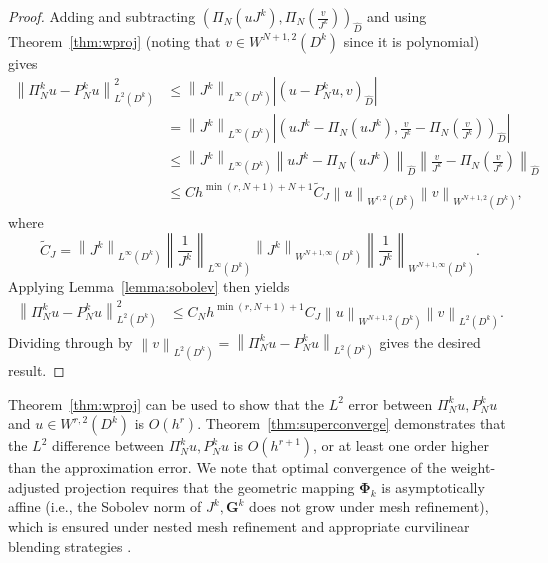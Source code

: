 \documentclass[preprint,10pt]{article}
\theoremstyle{definition}
\theoremstyle{lemma}
\theoremstyle{theorem}
\theoremstyle{assumption}
\renewcommand{\hat}{\widehat}
\renewcommand{\tilde}{\widetilde}
\newcommand{\nor}[1]{\left\| #1 \right\|}
\newcommand{\LRp}[1]{\left( #1 \right)}
\newcommand{\LRb}[1]{\left| #1 \right|}
\begin{document}
{\begin{proof}
Adding and subtracting $\LRp{\Pi_N\LRp{uJ^k},\Pi_N\LRp{\frac{v}{J^k}}}_{\hat{D}}$ and using Theorem~\ref{thm:wproj} (noting that $v\in W^{N+1,2}\LRp{D^k}$ since it is polynomial) gives
\begin{align*}
\nor{\Pi^k_Nu-P^k_Nu}_{L^2\LRp{D^k}}^2 &\leq \nor{J^k}_{L^{\infty}\LRp{D^k}}\LRb{\LRp{u-P_N^ku,v}_{\hat{D}}}\\
&= \nor{J^k}_{L^{\infty}\LRp{D^k}}\LRb{\LRp{uJ^k - \Pi_N\LRp{uJ^k},\frac{v}{J^k}-\Pi_N\LRp{\frac{v}{J^k}}}_{\hat{D}}} \\
&\leq \nor{J^k}_{L^{\infty}\LRp{D^k}}\nor{uJ^k - \Pi_N\LRp{uJ^k}}_{\hat{D}}\nor{\frac{v}{J^k}-\Pi_N\LRp{\frac{v}{J^k}}}_{\hat{D}}\\
&\leq C h^{\min\LRp{r,N+1}+N+1} \tilde{C}_J \nor{u}_{W^{r,2}\LRp{D^k}} \nor{v}_{W^{N+1,2}\LRp{D^k}},
\end{align*}
where 
\[
\tilde{C}_J = \nor{J^k}_{L^{\infty}\LRp{D^k}}\nor{\frac{1}{J^k}}_{L^{\infty}\LRp{D^k}} \nor{J^k}_{W^{N+1,\infty}\LRp{D^k}}\nor{\frac{1}{J^k}}_{W^{N+1,\infty}\LRp{D^k}}.
\]
Applying Lemma~\ref{lemma:sobolev} then yields
\begin{align*}
\nor{\Pi^k_Nu-P^k_Nu}_{L^2\LRp{D^k}}^2 &\leq C_N h^{\min\LRp{r,N+1}+1} C_J \nor{u}_{W^{N+1,2}\LRp{D^k}} \nor{v}_{L^2\LRp{D^k}}.
\end{align*}
Dividing through by $\nor{v}_{L^2\LRp{D^k}} = \nor{\Pi^k_N u - P_N^k  u}_{L^2\LRp{D^k}}$ gives the desired result.  %
\end{proof}
Theorem~\ref{thm:wproj} can be used to show that the $L^2$ error between $\Pi^k_N u, P^k_N u$ and $u \in W^{r,2}\LRp{D^k}$ is $O(h^r)$.  Theorem~\ref{thm:superconverge} demonstrates that the $L^2$ difference between $\Pi^k_N u, P^k_N u$ is $O(h^{r+1})$, or at least one order higher than the approximation error.  We note that optimal convergence of the weight-adjusted projection requires that the geometric mapping $\bm{\Phi}_k$ is asymptotically affine (i.e., the Sobolev norm of $J^k, \bm{G}^k$ does not grow under mesh refinement), which is ensured under nested mesh refinement and appropriate curvilinear blending strategies \cite{lenoir1986optimal, warburton2013low, chan2016weight2}.  

}
\end{document}
